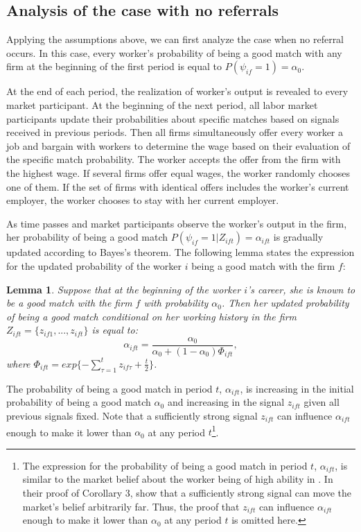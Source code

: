 \documentclass[12pt]{article}
\newtheorem{lemma}{Lemma}
\begin{document}
\subsection{Analysis of the case with no referrals}
Applying the assumptions above, we can first analyze the case when no referral occurs. In this case, every worker's probability of being a good match with any firm at the beginning of the first period is equal to $P(\psi_{if}=1) = \alpha_0$. 

At the end of each period, the realization of worker's output is revealed to every market participant. At the beginning of the next period, all labor market participants update their probabilities about specific matches based on signals received in previous periods. Then all firms simultaneously offer every worker a job and bargain with workers to determine the wage based on their evaluation of the specific match probability. The worker accepts the offer from the firm with the highest wage. If several firms offer equal wages, the worker randomly chooses one of them. If the set of firms with identical offers includes the worker's current employer, the worker chooses to stay with her current employer. 

As time passes and market participants observe the worker's output in the firm, her probability of being a good match $P(\psi_{if}=1 \vert Z_{ift}) = \alpha_{ift}$  is gradually updated according to Bayes's theorem. The following lemma states the expression for the updated probability of the worker $i$ being a good match with the firm $f$:
\begin{lemma}\label{lemma:alpha_it}
Suppose that at the beginning of the worker $i$'s career, she is known to be a good match with the firm $f$ with probability $\alpha_0$. Then her updated probability of being a good match conditional on her working history in the firm $Z_{ift} = \lbrace z_{if1},...,z_{ift} \rbrace$ is equal to:
\begin{equation}\label{eq:alpha_it}
\alpha_{ift} = \frac{\alpha_0}{\alpha_0 + (1-\alpha_0)\Phi_{ift}},
\end{equation}
where $\Phi_{ift} = exp\lbrace-\sum_{\tau = 1}^{t} z_{i f \tau}+\frac{t}{2}\rbrace$.
\end{lemma}
The probability of being a good match in period $t$, $\alpha_{ift}$, is increasing in the initial probability of being a good match $\alpha_0$ and increasing in the signal $z_{ift}$ given all previous signals fixed. Note that a sufficiently strong signal $z_{ift}$ can influence $\alpha_{ift}$ enough to make it lower than $\alpha_0$ at any period $t$\footnote{The expression for the probability of being a good match in period $t$, $\alpha_{ift}$, is similar to the market belief about the worker being of high ability in \cite{gibbons1999theory}. In their proof of Corollary 3, \cite{gibbons1999theory} show that a sufficiently strong signal can move the market's belief arbitrarily far. Thus, the proof that $z_{ift}$ can influence $\alpha_{ift}$ enough to make it lower than $\alpha_0$ at any period $t$ is omitted here.}.
\end{document}
